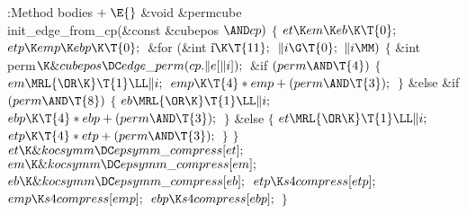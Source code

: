 \Y\B\4:Method bodies\X${}\mathrel+\E{}$\6
\&{void} \&{permcube}\DC\\{init\_edge\_from\_cp}(\&{const} \&{cubepos} ${}{%
\AND}\\{cp}){}$\1\1\2\2\6
${}\{{}$\1\6
${}\\{et}\K\\{em}\K\\{eb}\K\T{0};{}$\6
${}\\{etp}\K\\{emp}\K\\{ebp}\K\T{0};{}$\6
\&{for} (\&{int} \|i${}\K\T{11};{}$ ${}\|i\G\T{0};{}$ ${}\|i\MM){}$\5
${}\{{}$\1\6
\&{int} \\{perm}${}\K\&{cubepos}\DC\\{edge\_perm}(\\{cp}.\|e[\|i]);{}$\7
\&{if} ${}(\\{perm}\AND\T{4}){}$\5
${}\{{}$\1\6
${}\\{em}\MRL{{\OR}{\K}}\T{1}\LL\|i;{}$\6
${}\\{emp}\K\T{4}*\\{emp}+(\\{perm}\AND\T{3});{}$\6
\4${}\}{}$\2\6
\&{else} \&{if} ${}(\\{perm}\AND\T{8}){}$\5
${}\{{}$\1\6
${}\\{eb}\MRL{{\OR}{\K}}\T{1}\LL\|i;{}$\6
${}\\{ebp}\K\T{4}*\\{ebp}+(\\{perm}\AND\T{3});{}$\6
\4${}\}{}$\2\6
\&{else}\5
${}\{{}$\1\6
${}\\{et}\MRL{{\OR}{\K}}\T{1}\LL\|i;{}$\6
${}\\{etp}\K\T{4}*\\{etp}+(\\{perm}\AND\T{3});{}$\6
\4${}\}{}$\2\6
\4${}\}{}$\2\6
${}\\{et}\K\&{kocsymm}\DC\\{epsymm\_compress}[\\{et}];{}$\6
${}\\{em}\K\&{kocsymm}\DC\\{epsymm\_compress}[\\{em}];{}$\6
${}\\{eb}\K\&{kocsymm}\DC\\{epsymm\_compress}[\\{eb}];{}$\6
${}\\{etp}\K\\{s4compress}[\\{etp}];{}$\6
${}\\{emp}\K\\{s4compress}[\\{emp}];{}$\6
${}\\{ebp}\K\\{s4compress}[\\{ebp}];{}$\6
\4${}\}{}$\2\par
\fi

